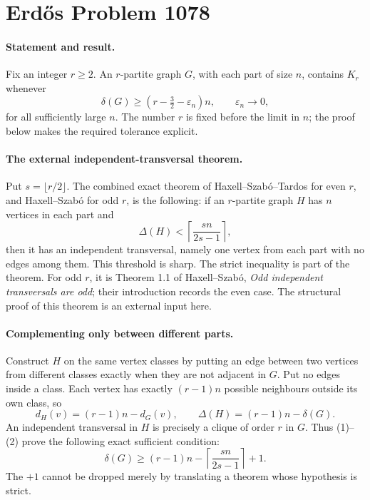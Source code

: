 \section*{Erd\H{o}s Problem 1078}

\paragraph{Statement and result.}
Fix an integer \(r\geq2\). An \(r\)-partite graph \(G\), with each part of size \(n\), contains \(K_r\) whenever
\[
 \delta(G)\geq(r-\tfrac32-\varepsilon_n)n,\qquad
 \varepsilon_n\longrightarrow0,
\]
for all sufficiently large \(n\). The number \(r\) is fixed before the limit in \(n\); the proof below makes the required tolerance explicit.

\paragraph{The external independent-transversal theorem.}
Put \(s=\lfloor r/2\rfloor\). The combined exact theorem of Haxell--Szab\'o--Tardos for even \(r\), and Haxell--Szab\'o for odd \(r\), is the following: if an \(r\)-partite graph \(H\) has \(n\) vertices in each part and
\[
 \Delta(H)<\left\lceil\frac{s n}{2s-1}\right\rceil,
 \tag{1}
\]
then it has an independent transversal, namely one vertex from each part with no edges among them. This threshold is sharp. The strict inequality is part of the theorem. For odd \(r\), it is Theorem 1.1 of Haxell--Szab\'o, \emph{Odd independent transversals are odd}; their introduction records the even case. The structural proof of this theorem is an external input here.

\paragraph{Complementing only between different parts.}
Construct \(H\) on the same vertex classes by putting an edge between two vertices from different classes exactly when they are not adjacent in \(G\). Put no edges inside a class. Each vertex has exactly \((r-1)n\) possible neighbours outside its own class, so
\[
 d_H(v)=(r-1)n-d_G(v),\qquad
 \Delta(H)=(r-1)n-\delta(G).
 \tag{2}
\]
An independent transversal in \(H\) is precisely a clique of order \(r\) in \(G\). Thus (1)--(2) prove the following exact sufficient condition:
\[
 \delta(G)\geq
 (r-1)n-\left\lceil\frac{s n}{2s-1}\right\rceil+1.
 \tag{3}
\]
The \(+1\) cannot be dropped merely by translating a theorem whose hypothesis is strict.

